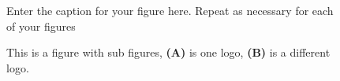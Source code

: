 \documentclass[utf8]{frontiersSCNS} %
\begin{document}
\begin{figure}[h!]
\begin{center}
\end{center}
\caption{Enter the caption for your figure here.  Repeat as  necessary for each of your figures}\label{fig:1}
\end{figure}


\begin{figure}[h!]
\begin{center}
\end{center}
\caption{This is a figure with sub figures, \textbf{(A)} is one logo, \textbf{(B)} is a different logo.}\label{fig:2}
\end{figure}


\end{document}
